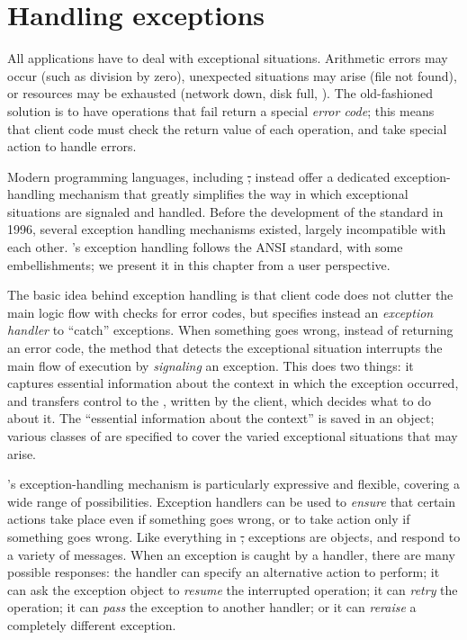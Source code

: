 \documentclass[a4paper,10pt,twoside]{book}
\begin{document}
	\sloppy
\fi

\chapter{Handling exceptions}

All applications have to deal with exceptional situations.
Arithmetic errors may occur (such as division by zero), unexpected situations may arise (file not found), or resources may be exhausted (network down, disk full, \etc).
The old-fashioned solution is to have operations that fail return a special \emph{error code}; this means that client code must check the return value of each operation, and take special action to handle errors.

Modern programming languages, including \st, instead offer a dedicated exception-handling mechanism that greatly simplifies the way in which exceptional situations are signaled and handled.
Before the development of the  standard in 1996, several  exception handling mechanisms existed, largely incompatible with each other. \pharo's exception handling follows the ANSI standard, with some embellishments; we present it in this chapter from a user perspective.

The basic idea behind exception handling is that 
client code does not clutter the main logic flow with checks for error codes, but specifies instead an \emph{exception handler} to ``catch'' exceptions.
When something goes wrong, instead of returning an error code, the method that detects the exceptional situation interrupts the main flow of execution by  \emph{signaling} an exception.
This does two things: it captures essential information about the context in which the exception occurred, and transfers control to the , written by the client, which decides what to do about it.
The ``essential information about the context'' is saved in an  object; 
various classes of  are specified to cover the varied exceptional situations that may arise.

\pharo's exception-handling mechanism is particularly expressive and flexible, covering a wide range of possibilities. Exception handlers can be used to \emph{ensure} that certain actions take place even if something goes wrong, or to take action only if something goes wrong.
Like everything in \st, exceptions are objects, and respond to a variety of messages.
When an exception is caught by a handler, there are many possible responses: the  handler can specify an alternative action to perform; it can ask the exception object to \emph{resume} the interrupted operation; it can \emph{retry} the operation; it can \emph{pass} the exception to another handler; or it can \emph{reraise} a completely different exception.
\end{document}
